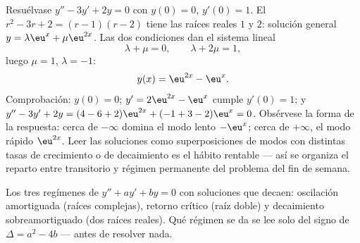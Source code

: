 \begin{example}\label{ex:b1:diffeq:cauchy2}
Resuélvase $y'' - 3y' + 2y = 0$ con $y(0) = 0$, $y'(0) = 1$. El
 $r^2 - 3r + 2 = (r - 1)(r - 2)$ tiene las
raíces reales $1$ y $2$: solución general $y = \lambda\eu^{x} +
\mu\eu^{2x}$. Las dos condiciones dan el sistema lineal
\[
\lambda + \mu = 0, \qquad \lambda + 2\mu = 1 ,
\]
luego $\mu = 1$, $\lambda = -1$:
\[
y(x) = \eu^{2x} - \eu^{x} .
\]
Comprobación: $y(0) = 0$; $y' = 2\eu^{2x} - \eu^x$ cumple $y'(0) = 1$;
y $y'' - 3y' + 2y = (4 - 6 + 2)\eu^{2x} + (-1 + 3 - 2)\eu^x = 0$.
Obsérvese la forma de la respuesta: cerca de $-\infty$ domina el modo
lento $-\eu^x$; cerca de $+\infty$, el modo rápido $\eu^{2x}$. Leer las
soluciones como superposiciones de modos con distintas tasas de
crecimiento o de decaimiento es el hábito rentable --- así se organiza
el reparto entre transitorio y régimen permanente del problema del fin
de semana.
\end{example}

\begin{omfigure}

{\small Los tres regímenes de $y'' + ay' + by = 0$ con soluciones que
decaen: oscilación amortiguada (raíces complejas), retorno crítico
(raíz doble) y decaimiento sobreamortiguado (dos raíces reales). Qué
régimen se da se lee solo del signo de $\Delta = a^2 - 4b$ --- antes de
resolver nada.}
\end{omfigure}

